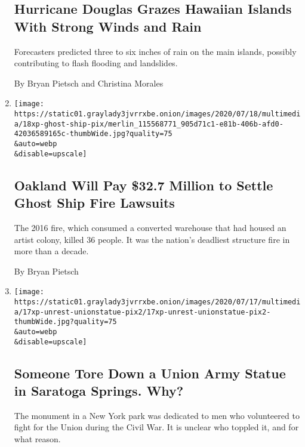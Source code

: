 \begin{enumerate}
  \hypertarget{hurricane-douglas-grazes-hawaiian-islands-with-strong-winds-and-rain}{%
  \subsection{Hurricane Douglas Grazes Hawaiian Islands With Strong
  Winds and
  Rain}\label{hurricane-douglas-grazes-hawaiian-islands-with-strong-winds-and-rain}}

  Forecasters predicted three to six inches of rain on the main islands,
  possibly contributing to flash flooding and landslides.

  By Bryan Pietsch and Christina Morales
\item
  \href{/2020/07/18/us/ghost-ship-fire-settlement.html}{}

  \texttt{[image: https://static01.graylady3jvrrxbe.onion/images/2020/07/18/multimedia/18xp-ghost-ship-pix/merlin\_115568771\_905d71c1-e81b-406b-afd0-42036589165c-thumbWide.jpg?quality=75\\\&auto=webp\\\&disable=upscale]}

  \hypertarget{oakland-will-pay-327-million-to-settle-ghost-ship-fire-lawsuits}{%
  \subsection{Oakland Will Pay \$32.7 Million to Settle Ghost Ship Fire
  Lawsuits}\label{oakland-will-pay-327-million-to-settle-ghost-ship-fire-lawsuits}}

  The 2016 fire, which consumed a converted warehouse that had housed an
  artist colony, killed 36 people. It was the nation's deadliest
  structure fire in more than a decade.

  By Bryan Pietsch
\item
  \href{/2020/07/18/us/union-statue-saratoga-springs-ny.html}{}

  \texttt{[image: https://static01.graylady3jvrrxbe.onion/images/2020/07/17/multimedia/17xp-unrest-unionstatue-pix2/17xp-unrest-unionstatue-pix2-thumbWide.jpg?quality=75\\\&auto=webp\\\&disable=upscale]}

  \hypertarget{someone-tore-down-a-union-army-statue-in-saratoga-springs-why}{%
  \subsection{Someone Tore Down a Union Army Statue in Saratoga Springs.
  Why?}\label{someone-tore-down-a-union-army-statue-in-saratoga-springs-why}}

  The monument in a New York park was dedicated to men who volunteered
  to fight for the Union during the Civil War. It is unclear who toppled
  it, and for what reason.


\end{enumerate}
